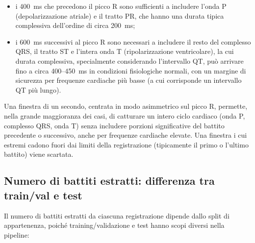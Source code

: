 \begin{itemize}
	\item i 400~ms che precedono il picco R sono sufficienti a includere l'onda P (depolarizzazione atriale) e il tratto PR, che hanno una durata tipica complessiva dell'ordine di circa 200~ms;
	\item i 600~ms successivi al picco R sono necessari a includere il resto del complesso QRS, il tratto ST e l'intera onda T (ripolarizzazione ventricolare), la cui durata complessiva, specialmente considerando l'intervallo QT, può arrivare fino a circa 400--450~ms in condizioni fisiologiche normali, con un margine di sicurezza per frequenze cardiache più basse (a cui corrisponde un intervallo QT più lungo).
\end{itemize}

Una finestra di un secondo, centrata in modo asimmetrico sul picco R, permette, nella grande maggioranza dei casi, di catturare un intero ciclo cardiaco (onda P, complesso QRS, onda T) senza includere porzioni significative del battito precedente o successivo, anche per frequenze cardiache elevate. Una finestra i cui estremi cadono fuori dai limiti della registrazione (tipicamente il primo o l'ultimo battito) viene scartata.

\subsection{Numero di battiti estratti: differenza tra train/val e test}
\label{sec:beat_count_per_split}

Il numero di battiti estratti da ciascuna registrazione dipende dallo split di appartenenza, poiché training/validazione e test hanno scopi diversi nella pipeline:

